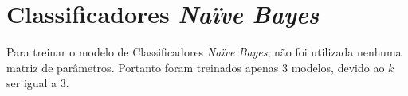 \section{Classificadores \textit{Naïve Bayes}}
\label{sec:nb}

Para treinar o modelo de Classificadores \textit{Naïve Bayes}, não foi utilizada nenhuma matriz de parâmetros.
Portanto foram treinados apenas 3 modelos, devido ao $k$ ser igual a 3.
